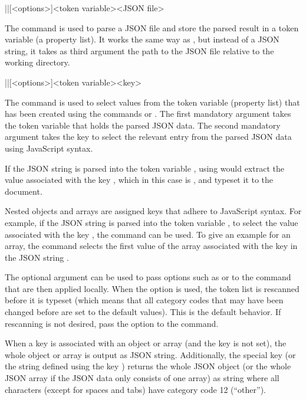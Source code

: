 \documentclass[a4paper]{article}
\begin{document}
{{\begin{macrodef}
|\JSONParseFromFile|[<options>]{<token variable>}{<JSON file>}
\end{macrodef}
The command \macro{\JSONParseFromFile} is used to parse a JSON file and store the parsed result in a token variable (a property list). It works the same way as \macro{\JSONParse}, but instead of a JSON string, it takes as third argument the path to the JSON file relative to the working directory.

\begin{macrodef}
|\JSONParseValue|[<options>]{<token variable>}{<key>}
\end{macrodef}
The command \macro{\JSONParseValue} is used to select values from the token variable (property list) that has been created using the commands \macro{\JSONParse} or \macro{\JSONParseFromFile}. The first mandatory argument takes the token variable that holds the parsed JSON data. The second mandatory argument takes the key to select the relevant entry from the parsed JSON data using JavaScript syntax.

If the JSON string  is parsed into the token variable \macro{\myJSONdata}, using  would extract the value associated with the key , which in this case is , and typeset it to the document.

Nested objects and arrays are assigned keys that adhere to JavaScript syntax. For example, if the JSON string  is parsed into the token variable \macro{\myJSONdata}, to select the value associated with the key , the command  can be used. To give an example for an array, the command  selects the first value of the array associated with the key  in the JSON string .

The optional argument can be used to pass options such as  or  to the command that are then applied locally. When the option  is used, the token list is rescanned before it is typeset (which means that all category codes that may have been changed before are set to the default values). This is the default behavior. If rescanning is not desired, pass the option  to the command.

When a key is associated with an object or array (and the key  is not set), the whole object or array is output as JSON string. Additionally, the special key  (or the string defined using the key ) returns the whole JSON object (or the whole JSON array if the JSON data only consists of one array) as string where all characters (except for spaces and tabs) have category code 12 (``other'').

}}
\end{document}
